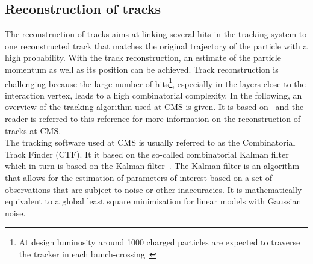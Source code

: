 \subsection{Reconstruction of tracks}
\label{subsec:TrackReconstruction}
The reconstruction of tracks aims at linking several hits in the tracking system to one reconstructed track that matches the original trajectory of the particle with a high probability.
With the track reconstruction, an estimate of the particle momentum as well as its position can be achieved.
Track reconstruction is challenging because the large number of hits\footnote{At design luminosity around 1000 charged particles are expected to traverse the tracker in each bunch-crossing~\cite{bib:CMS:tracking_8TeV}}, especially in the layers close to the interaction vertex, leads to a high combinatorial complexity. 
In the following, an overview of the tracking algorithm used at CMS is given.
It is based on~\cite{bib:CMS:tracking_8TeV} and the reader is referred to this reference for more information on the reconstruction of tracks at CMS.\\

The tracking software used at CMS is usually referred to as the Combinatorial Track Finder (CTF).
It it based on the so-called combinatorial Kalman filter~\cite{bib:TrackAlgorithm_1989,bib:TrackAlgorithm_1990,bib:TrackAlgorithm_1997} which in turn is based on the Kalman filter~\cite{bib:KalmanFilter_1987}.
The Kalman filter is an algorithm that allows for the estimation of parameters of interest based on a set of observations that are subject to noise or other inaccuracies.
It is mathematically equivalent to a global least square minimisation for linear models with Gaussian noise.

